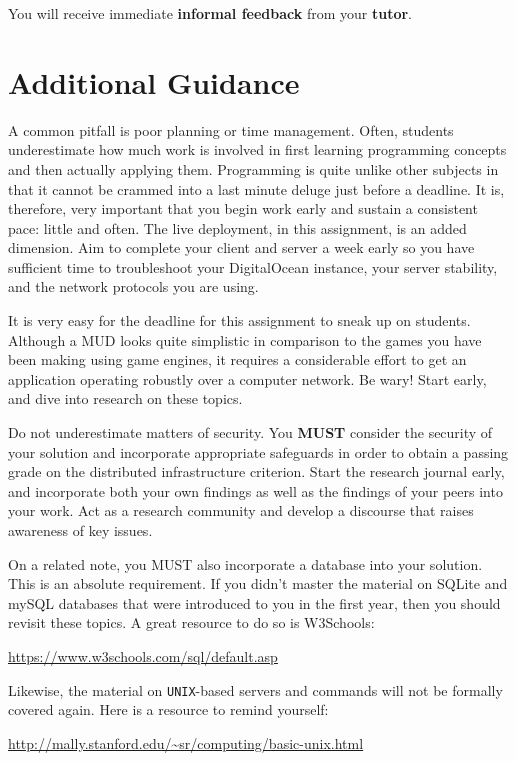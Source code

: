 \documentclass{../../fal_assignment}
\begin{document}
You will receive immediate \textbf{informal feedback} from your \textbf{tutor}.

\section*{Additional Guidance}

A common pitfall is poor planning or time management. Often, students underestimate how much work is involved in first learning programming concepts and then actually applying them. Programming is quite unlike other subjects in that it cannot be crammed into a last minute deluge just before a deadline. It is, therefore, very important that you begin work early and sustain a consistent pace: little and often. The live deployment, in this assignment, is an added dimension. Aim to complete your client and server a week early so you have sufficient time to troubleshoot your DigitalOcean instance, your server stability, and the network protocols you are using.

It is very easy for the deadline for this assignment to sneak up on students. Although a MUD looks quite simplistic in comparison to the games you have been making using game engines, it requires a considerable effort to get an application operating robustly over a computer network. Be wary! Start early, and dive into research on these topics. 

Do not underestimate matters of security. You \textbf{MUST} consider the security of your solution and incorporate appropriate safeguards in order to obtain a passing grade on the distributed infrastructure criterion. Start the research journal early, and incorporate both your own findings as well as the findings of your peers into your work. Act as a research community and develop a discourse that raises awareness of key issues.

On a related note, you MUST also incorporate a database into your solution.
This is an absolute requirement. If you didn't master the material on SQLite
and mySQL databases that were introduced to you in the first year, then you
should revisit these topics. A great resource to do so is 
W3Schools:

\url{https://www.w3schools.com/sql/default.asp}

Likewise, the material on \texttt{UNIX}-based servers and commands will not be formally covered again. Here is a resource to remind yourself:

\url{http://mally.stanford.edu/~sr/computing/basic-unix.html}
\end{document}
